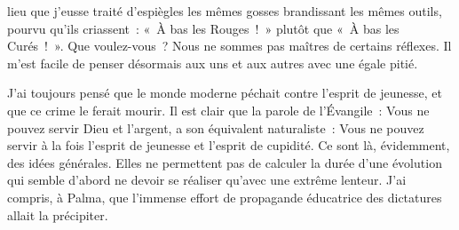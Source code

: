 \documentclass[french,twoside]{book} %
\newcommand{\astertri}{\medskip\par\centerline{\color{rubric}\large\selectfont{\syms ✻\,✻\,✻}}\medskip\par}%
\begin{document}
lieu que j’eusse traité d’espiègles les mêmes gosses brandissant les mêmes outils, pourvu qu’ils criassent : « À bas les Rouges ! » plutôt que « À bas les Curés ! ». Que voulez-vous ? Nous ne sommes pas maîtres de certains réflexes. Il m’est facile de penser désormais aux uns et aux autres avec une égale pitié.\par
\bigbreak
\noindent J’ai toujours pensé que le monde moderne péchait contre l’esprit de jeunesse, et que ce crime le ferait mourir. Il est clair que la parole de l’Évangile : Vous ne pouvez servir Dieu et l’argent, a son équivalent naturaliste : Vous ne pouvez servir à la fois l’esprit de jeunesse et l’esprit de cupidité. Ce sont là, évidemment, des idées générales. Elles ne permettent pas de calculer la durée d’une évolution qui semble d’abord ne devoir se réaliser qu’avec une extrême lenteur. J’ai compris, à Palma, que l’immense effort de propagande éducatrice des dictatures allait la précipiter.\par

\astertri
\end{document}
